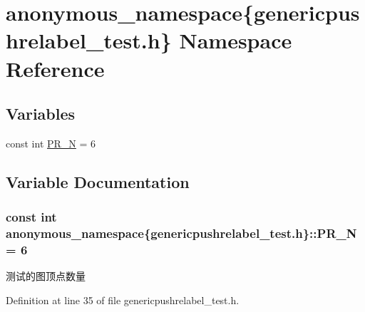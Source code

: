 \hypertarget{namespaceanonymous__namespace_02genericpushrelabel__test_8h_03}{}\section{anonymous\+\_\+namespace\{genericpushrelabel\+\_\+test.\+h\} Namespace Reference}
\label{namespaceanonymous__namespace_02genericpushrelabel__test_8h_03}
\subsection*{Variables}
\begin{DoxyCompactItemize}
\item 
const int \hyperlink{namespaceanonymous__namespace_02genericpushrelabel__test_8h_03_af519cdaca560a53a83d9d1ec43fdb834}{P\+R\+\_\+\+N} = 6
\end{DoxyCompactItemize}


\subsection{Variable Documentation}
\hypertarget{namespaceanonymous__namespace_02genericpushrelabel__test_8h_03_af519cdaca560a53a83d9d1ec43fdb834}{}
\subsubsection[{P\+R\+\_\+\+N}]{\setlength{\rightskip}{0pt plus 5cm}const int anonymous\+\_\+namespace\{genericpushrelabel\+\_\+test.\+h\}\+::P\+R\+\_\+\+N = 6}\label{namespaceanonymous__namespace_02genericpushrelabel__test_8h_03_af519cdaca560a53a83d9d1ec43fdb834}
测试的图顶点数量 

Definition at line 35 of file genericpushrelabel\+\_\+test.\+h.

